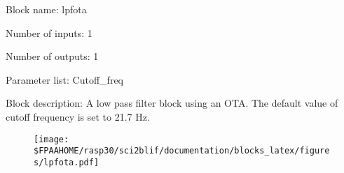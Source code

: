 \pagebreak

Block name: lpfota

Number of inputs: 1

Number of outputs: 1

Parameter list: Cutoff\_freq

Block description: 
A low pass filter block using an OTA. The default value of cutoff frequency is set to 21.7 Hz.

\begin{figure}[H]  %
\texttt{[image: \$FPAAHOME/rasp30/sci2blif/documentation/blocks\_latex/figures/lpfota.pdf]}
\end{figure}

